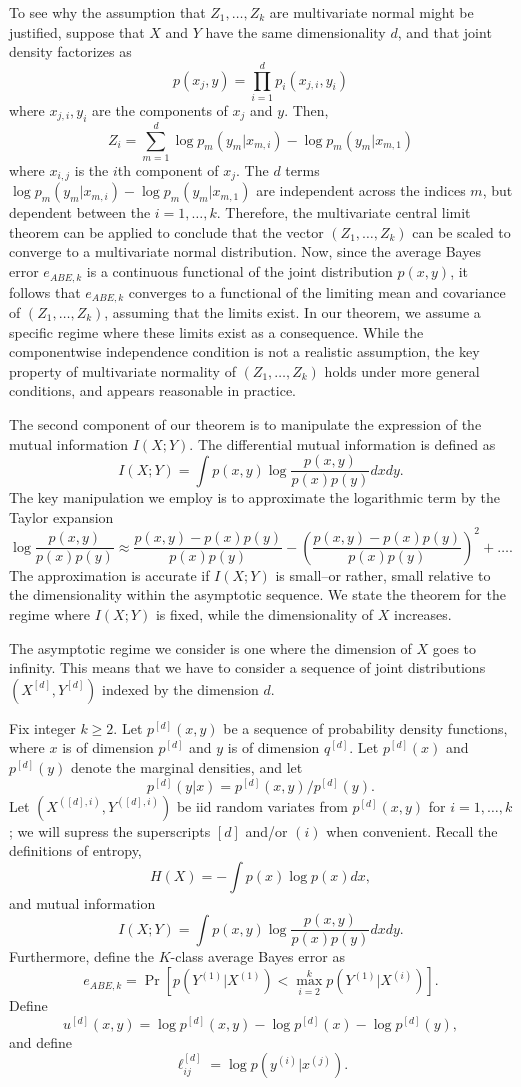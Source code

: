 \documentclass{article}
\begin{document}
To see why the assumption that $Z_1,\hdots, Z_k$ are multivariate normal might be justified, suppose that $X$ and $Y$ have the same dimensionality $d$, and that
joint density factorizes as
\[
p(x_j, y) = \prod_{i=1}^d p_i(x_{j, i}, y_i)
\]
where $x_{j, i}, y_i$ are the components of $x_j$ and $y$.
Then,
\[
Z_i = \sum_{m=1}^d \log p_m(y_m | x_{m, i}) - \log p_m(y_m | x_{m, 1})
\]
where $x_{i, j}$ is the $i$th component of $x_j$.
The $d$ terms $\log p_m(y_m | x_{m, i}) - \log p_m(y_m | x_{m, 1})$ are independent across the indices $m$,
but dependent between the $i = 1,\hdots, k$.
Therefore, the multivariate central limit theorem can be applied to conclude that the vector
$(Z_1,\hdots, Z_k)$ can be scaled to converge to a multivariate normal distribution.
Now, since the average Bayes error $e_{ABE,k}$ is a continuous functional of the joint distribution $p(x, y)$,
it follows that $e_{ABE,k}$ converges to a functional of the limiting mean and covariance of $(Z_1,\hdots, Z_k)$, assuming
that the limits exist.
In our theorem, we assume a specific regime where these limits exist as a consequence.
While the componentwise independence condition is not a realistic assumption,
the key property of multivariate normality of $(Z_1,\hdots, Z_k)$ holds under more general conditions, and appears reasonable in practice.

The second component of our theorem is to manipulate the expression of the mutual information $I(X; Y)$.
The differential mutual information is defined as
\[
I(X; Y) = \int p(x, y) \log \frac{p(x, y)}{p(x) p(y)} dx dy.
\]
The key manipulation we employ is to approximate the logarithmic term by the Taylor expansion
\[
\log \frac{p(x, y)}{p(x) p(y)} \approx \frac{p(x, y) - p(x) p(y)}{p(x) p(y)} - \left(\frac{p(x, y) - p(x) p(y)}{p(x) p(y)}\right)^2 + \hdots.
\]
The approximation is accurate if $I(X; Y)$ is small--or rather, small relative to the dimensionality within the asymptotic sequence.
We state the theorem for the regime where $I(X; Y)$ is fixed, while the dimensionality of $X$ increases.

The asymptotic regime we consider is one where the dimension of $X$ goes to infinity.
This means that we have to consider a sequence of joint distributions $(X^{[d]}, Y^{[d]})$ indexed by the dimension $d$.

Fix integer $k \geq 2$.  Let $p^{[d]}(x,y)$ be a sequence of
probability density functions, where $x$ is of dimension $p^{[d]}$ and
$y$ is of dimension $q^{[d]}$.  Let $p^{[d]}(x)$ and $p^{[d]}(y)$
denote the marginal densities, and let
\[
p^{[d]}(y|x) = p^{[d]}(x, y)/p^{[d]}(y).\]
 Let $(X^{([d], i)}, Y^{([d], i)})$ be
iid random variates from $p^{[d]}(x, y)$ for $i = 1, \hdots, k$; we will supress the
superscripts $[d]$ and/or $(i)$ when convenient.  Recall the definitions of
entropy,
\[
H(X) = -\int p(x) \log p(x) dx,
\]
and mutual information
\[
I(X; Y) = \int p(x, y) \log \frac{p(x, y)}{p(x)p(y)} dx dy.
\]
Furthermore, define the $K$-class average Bayes error as
\[
e_{ABE, k} = \Pr[p(Y^{(1)}|X^{(1)}) < \max_{i = 2}^{k} p(Y^{(1)}|X^{(i)})].
\]
Define
\[
u^{[d]}(x, y) = \log p^{[d]}(x, y) - \log p^{[d]}(x) - \log p^{[d]}(y),
\]
and define
\[
\ell_{ij}^{[d]} = \log p(y^{(i)}|x^{(j)}).
\]
\end{document}
